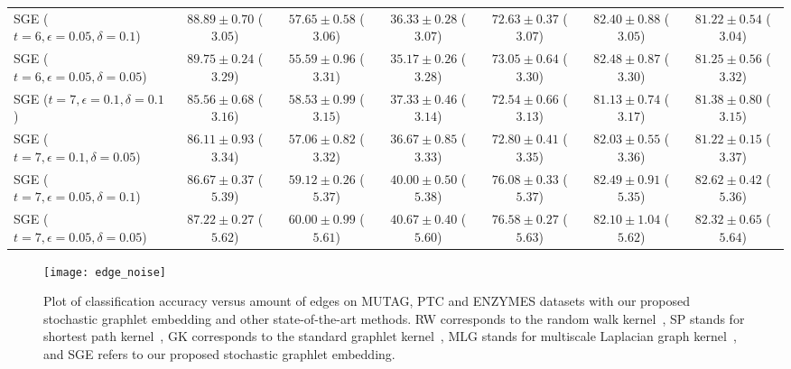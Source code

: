 \documentclass[journal]{IEEEtran}
\theoremstyle{definition}
\begin{document}
\begin{table*}[!htbp]
\begin{center}
{\begin{tabular}{|l|c|c|c|c|c|c|}
SGE ($t=6, \epsilon = 0.05, \delta = 0.1$) & $88.89\pm 0.70$ ($3.05$) & $57.65\pm 0.58$ ($3.06$) & $36.33\pm 0.28$ ($3.07$) & $72.63\pm 0.37$ ($3.07$) & $82.40\pm 0.88$ ($3.05$) & $81.22\pm 0.54$ ($3.04$) \\
SGE ($t=6, \epsilon = 0.05, \delta = 0.05$) & $\mathbf{89.75\pm 0.24}$ ($3.29$) & $55.59\pm 0.96$ ($3.31$) & $35.17\pm 0.26$ ($3.28$) & $73.05\pm 0.64$ ($3.30$) & $82.48\pm 0.87$ ($3.30$) & $81.25\pm 0.56$ ($3.32$) \\
\hline
SGE ($t=7, \epsilon = 0.1, \delta = 0.1$) & $85.56\pm 0.68$ ($3.16$) & $58.53\pm 0.99$ ($3.15$) & $37.33\pm 0.46$ ($3.14$) & $72.54\pm 0.66$ ($3.13$) & $81.13\pm 0.74$ ($3.17$) & $81.38\pm 0.80$ ($3.15$) \\
SGE ($t=7, \epsilon = 0.1, \delta = 0.05$) & $86.11\pm 0.93$ ($3.34$) & $57.06\pm 0.82$ ($3.32$) & $36.67\pm 0.85$ ($3.33$) & $72.80\pm 0.41$ ($3.35$) & $82.03\pm 0.55$ ($3.36$) & $81.22\pm 0.15$ ($3.37$) \\
SGE ($t=7, \epsilon = 0.05, \delta = 0.1$) & $86.67\pm 0.37$ ($5.39$) & $59.12\pm 0.26$ ($5.37$) & $40.00\pm 0.50$ ($5.38$) & $76.08\pm 0.33$ ($5.37$) & $\mathbf{82.49\pm 0.91}$ ($5.35$) & $\mathbf{82.62\pm 0.42}$ ($5.36$) \\
SGE ($t=7, \epsilon = 0.05, \delta = 0.05$) & $87.22\pm 0.27$ ($5.62$) & $60.00\pm 0.99$ ($5.61$) & $\mathbf{40.67\pm 0.40}$ ($5.60$) & $\mathbf{76.58\pm 0.27}$ ($5.63$) & $82.10\pm 1.04$ ($5.62$) & $82.32\pm 0.65$ ($5.64$) \\
\hline
\end{tabular}}
\end{center}
\end{table*}

\begin{figure*}
\centering
\texttt{[image: edge\_noise]}
\caption{Plot of classification accuracy versus amount of edges on MUTAG, PTC and ENZYMES datasets with our proposed stochastic graphlet embedding and other state-of-the-art methods. RW corresponds to the random walk kernel~\cite{Vishwanathan2010}, SP stands for shortest path kernel~\cite{Borgwardt2005}, GK corresponds to the standard graphlet kernel~\cite{Shervashidze2009}, MLG stands for multiscale Laplacian graph kernel~\cite{Kondor2016}, and SGE refers to our proposed stochastic graphlet embedding.}
\label{fig:expt-noisy-graphs}
\end{figure*}
\end{document}
